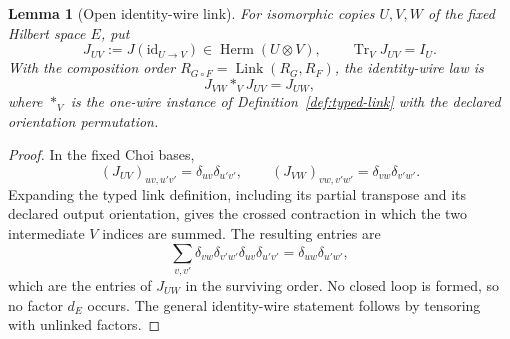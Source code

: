 \documentclass[11pt,a4paper]{article}
\theoremstyle{definition}
\theoremstyle{plain}
\newtheorem{lemma}[theorem]{Lemma}
\theoremstyle{remark}
\DeclareMathOperator{\Tr}{Tr}
\DeclareMathOperator{\Herm}{Herm}
\newcommand{\id}{\mathrm{id}}
\begin{document}
\begin{lemma}[Open identity-wire link]
\label{lem:open-wire}
For isomorphic copies $U,V,W$ of the fixed Hilbert space $E$, put
\[
J_{UV}:=J(\id_{U\to V})\in\Herm(U\otimes V),
\qquad \Tr_VJ_{UV}=I_U.
\]
With the composition order $R_{G\circ F}=\operatorname{Link}(R_G,R_F)$,
the identity-wire law is
\[
J_{VW}*_{V}J_{UV}=J_{UW},
\]
where $*_V$ is the one-wire instance of Definition~\ref{def:typed-link}
with the declared orientation permutation.
\end{lemma}
\begin{proof}
In the fixed Choi bases,
\[
(J_{UV})_{uv,u'v'}=\delta_{uv}\delta_{u'v'},
\qquad
(J_{VW})_{vw,v'w'}=\delta_{vw}\delta_{v'w'}.
\]
Expanding the typed link definition, including its partial transpose and
its declared output orientation, gives the crossed contraction in which
the two intermediate $V$ indices are summed. The resulting entries are
\[
\sum_{v,v'}\delta_{vw}\delta_{v'w'}\delta_{uv}\delta_{u'v'}
=\delta_{uw}\delta_{u'w'},
\]
which are the entries of $J_{UW}$ in the surviving order. No
closed loop is formed, so no factor $d_E$ occurs. The general
identity-wire statement follows by tensoring with unlinked factors.
\end{proof}
\end{document}
